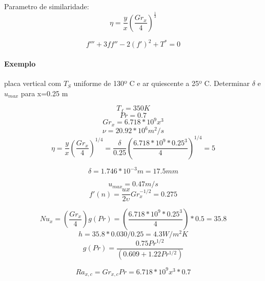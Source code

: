 Parametro de similaridade:
\[\eta=\frac{y}{x}(\frac{Gr_{x}}{4})^{\frac{1}{3}} \]

\[f'''+3ff''-2(f')^{2}+T^{*}=0\]

\paragraph*{Exemplo} 
placa vertical com $T_{S}$ uniforme de 130º C e ar quiescente a 25º C. Determinar $\delta$ e $u_{max}$ para x=0.25 m

\[T_{f}=350K\]
\[Pr=0.7\]
\[Gr_{x}=6.718*10^{9}x^{3}\]
\[\nu = 20.92*10^{6}m^{2}/s\]
\[\eta = \frac{y}{x}(\frac{Gr_{x}}{4})^{1/4}=\frac{\delta}{0.25}(\frac{6.718*10^{9}*0.25^{3}}{4})^{1/4}=5\]

\[\delta = 1.746*10^{-3}m=17.5mm\]

\[u_{max}=0.47m/s\]
\[f'(n)=\frac{ux}{2\upsilon}Gr_{x}^{-1/2}=0.275\]



\[Nu_{x}=(\frac{Gr_{x}}{4})g(Pr)=(\frac{6.718*10^{9}*0.25^{3}}{4})*0.5=35.8\]
\[h=35.8*0.030/0.25=4.3W/m^{2}K\]
\[g(Pr)=\frac{0.75Pr^{1/2}}{(0.609+1.22Pr^{1/2})}\]

\[Ra_{x,c}=Gr_{x,c}Pr=6.718*10^{9}x^{3}*0.7\]